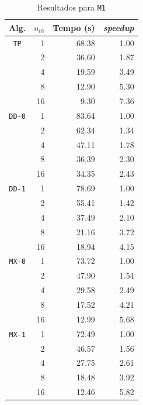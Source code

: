 \documentclass[10pt,a4paper,oneside]{article}
\begin{document}
\begin{table}[t]
  \begin{subtable}[b]{0.49\textwidth}
    \centering
    \scriptsize
    \begin{tabular}{|l|r|r|r|}
      \hline
      Alg. & $n_{th}$ & Tempo (s) & {\it speedup} \\ \hline
      \multicolumn{1}{|c|}{{\tt TP}} & 1 & 68.38 & 1.00 \\ \cline{ 2- 4}
      & 2 & 36.60 & 1.87 \\ \cline{ 2- 4}
      & 4 & 19.59 & 3.49 \\ \cline{ 2- 4}
      & 8 & 12.90 & 5.30 \\ \cline{ 2- 4}
      & 16 & 9.30 & 7.36 \\ \hline
      \multicolumn{ 1}{|c|}{{\tt DD-0}}  & 1 & 83.64 & 1.00 \\ \cline{ 2- 4}
      & 2 & 62.34 & 1.34 \\ \cline{ 2- 4}
      & 4 & 47.11 & 1.78 \\ \cline{ 2- 4}
      & 8 & 36.39 & 2.30 \\ \cline{ 2- 4}
      & 16 & 34.35 & 2.43 \\ \hline
      \multicolumn{ 1}{|c|}{{\tt DD-1}}  & 1 & 78.69 & 1.00 \\ \cline{ 2- 4}
      & 2 & 55.41 & 1.42 \\ \cline{ 2- 4}
      & 4 & 37.49 & 2.10 \\ \cline{ 2- 4}
      & 8 & 21.16 & 3.72 \\ \cline{ 2- 4}
      & 16 & 18.94 & 4.15 \\ \hline
      \multicolumn{ 1}{|c|}{{\tt MX-0}}  & 1 & 73.72 & 1.00 \\ \cline{ 2- 4}
      & 2 & 47.90 & 1.54 \\ \cline{ 2- 4}
      & 4 & 29.58 & 2.49 \\ \cline{ 2- 4}
      & 8 & 17.52 & 4.21 \\ \cline{ 2- 4}
      & 16 & 12.99 & 5.68 \\ \hline
      \multicolumn{ 1}{|c|}{{\tt MX-1}}  & 1 & 72.49 & 1.00 \\ \cline{ 2- 4}
      & 2 & 46.57 & 1.56 \\ \cline{ 2- 4}
      & 4 & 27.75 & 2.61 \\ \cline{ 2- 4}
      & 8 & 18.48 & 3.92 \\ \cline{ 2- 4}
      & 16 & 12.46 & 5.82 \\ \hline
    \end{tabular}
    \caption{Resultados para {\tt M1}}

\end{subtable}
\end{table}
\end{document}
